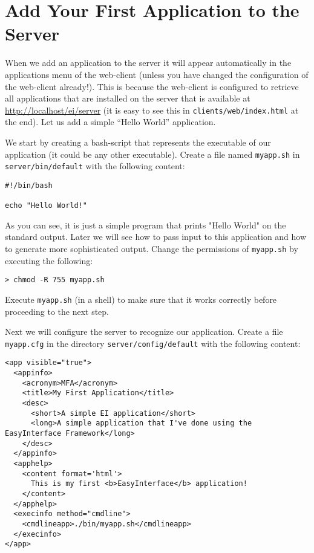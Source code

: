 \section{Add Your First Application to the \ei Server}

When we add an application to the \ei server it will appear
automatically in the applications menu of the web-client (unless you
have changed the configuration of the web-client already!).
%
This is because the web-client is configured to retrieve all
applications that are installed on the server that is available at
\url{http://localhost/ei/server} (it is easy to see this in
\texttt{clients/web/index.html} at the end). Let us add a simple
``Hello World'' application.


We start by creating a bash-script that represents the executable of
our application (it could be any other executable). Create a file
named \texttt{myapp.sh} in \texttt{server/bin/default} with the
following content:

\medskip
\begin{lstlisting}[style=script]
#!/bin/bash

echo "Hello World!"
\end{lstlisting}

\medskip
\noindent
As you can see, it is just a simple program that prints "Hello World"
on the standard output. Later we will see how to pass input to this
application and how to generate more sophisticated output.
%
Change the permissions of \texttt{myapp.sh} by executing the
following:

\medskip
\begin{lstlisting}
> chmod -R 755 myapp.sh
\end{lstlisting}

\medskip
\noindent
Execute \texttt{myapp.sh} (in a shell) to make sure that it works
correctly before proceeding to the next step.

Next we will configure the server to recognize our application.
%
Create a file \texttt{myapp.cfg} in the directory
\texttt{server/config/default} with the following content:

\medskip
\begin{lstlisting}
<app visible="true">
  <appinfo>
    <acronym>MFA</acronym>
    <title>My First Application</title>
    <desc>
      <short>A simple EI application</short>
      <long>A simple application that I've done using the EasyInterface Framework</long>
    </desc>
  </appinfo>
  <apphelp>
    <content format='html'>
      This is my first <b>EasyInterface</b> application!
    </content>
  </apphelp>
  <execinfo method="cmdline">
    <cmdlineapp>./bin/myapp.sh</cmdlineapp>
  </execinfo>
</app>
\end{lstlisting}

